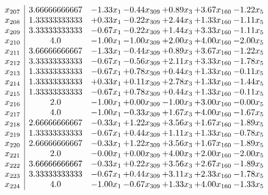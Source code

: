 \documentclass[8pt]{article}
\begin{document}
\[\begin{array}{c| c c@{\hskip 2pt} c@{\hskip 2pt} c@{\hskip 2pt} c@{\hskip 2pt} c@{\hskip 2pt} }
 x_{207}   &  3.66666666667 & -1.33 x_{1} & -0.44 x_{309} & +  0.89 x_{3} & +  3.67 x_{160} & -1.22 x_{5}\\
 x_{208}   &  1.33333333333 & +  0.33 x_{1} & -0.22 x_{309} & +  2.44 x_{3} & +  1.33 x_{160} & -1.11 x_{5}\\
 x_{209}   &  3.33333333333 & -0.67 x_{1} & -0.22 x_{309} & +  1.44 x_{3} & +  3.33 x_{160} & -1.11 x_{5}\\
 x_{210}   &  4.0 & -1.00 x_{1} & -1.00 x_{309} & +  2.00 x_{3} & +  4.00 x_{160} & -2.00 x_{5}\\
 x_{211}   &  3.66666666667 & -1.33 x_{1} & -0.44 x_{309} & +  0.89 x_{3} & +  3.67 x_{160} & -1.22 x_{5}\\
 x_{212}   &  3.33333333333 & -0.67 x_{1} & -0.56 x_{309} & +  2.11 x_{3} & +  3.33 x_{160} & -1.78 x_{5}\\
 x_{213}   &  1.33333333333 & -0.67 x_{1} & +  0.78 x_{309} & +  0.44 x_{3} & +  1.33 x_{160} & -0.11 x_{5}\\
 x_{214}   &  1.33333333333 & +  0.33 x_{1} & +  0.11 x_{309} & +  2.78 x_{3} & +  1.33 x_{160} & -1.44 x_{5}\\
 x_{215}   &  1.33333333333 & -0.67 x_{1} & +  0.78 x_{309} & +  0.44 x_{3} & +  1.33 x_{160} & -0.11 x_{5}\\
 x_{216}   &  2.0 & -1.00 x_{1} & +  0.00 x_{309} & -1.00 x_{3} & +  3.00 x_{160} & -0.00 x_{5}\\
 x_{217}   &  4.0 & -1.00 x_{1} & -0.33 x_{309} & +  1.67 x_{3} & +  4.00 x_{160} & -1.67 x_{5}\\
 x_{218}   &  2.66666666667 & -0.33 x_{1} & +  1.22 x_{309} & +  3.56 x_{3} & +  1.67 x_{160} & -1.89 x_{5}\\
 x_{219}   &  1.33333333333 & -0.67 x_{1} & +  0.44 x_{309} & +  1.11 x_{3} & +  1.33 x_{160} & -0.78 x_{5}\\
 x_{220}   &  2.66666666667 & -0.33 x_{1} & +  1.22 x_{309} & +  3.56 x_{3} & +  1.67 x_{160} & -1.89 x_{5}\\
 x_{221}   &  2.0 & -0.00 x_{1} & +  0.00 x_{309} & +  4.00 x_{3} & +  2.00 x_{160} & -2.00 x_{5}\\
 x_{222}   &  3.66666666667 & -0.33 x_{1} & +  0.22 x_{309} & +  3.56 x_{3} & +  2.67 x_{160} & -1.89 x_{5}\\
 x_{223}   &  3.33333333333 & -0.67 x_{1} & +  0.44 x_{309} & +  3.11 x_{3} & +  2.33 x_{160} & -1.78 x_{5}\\
 x_{224}   &  4.0 & -1.00 x_{1} & -0.67 x_{309} & +  1.33 x_{3} & +  4.00 x_{160} & -1.33 x_{5}\\

\end{array}\]
\end{document}
